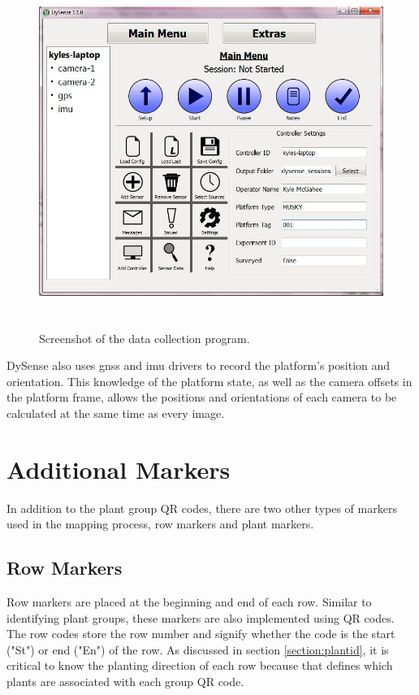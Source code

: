 \begin{figure}
	\centering
    \includegraphics[height=4.5in]{figures/dysense2.jpg}
    \caption[Data collection program]{Screenshot of the data collection program.}
    \label{dysense_screenshot}
\end{figure}

DySense also uses \ac{gnss} and \ac{imu} drivers to record the platform's position and orientation.  This knowledge of the platform state, as well as the camera offsets in the platform frame, allows the positions and orientations of each camera to be calculated at the same time as every image.  

\section{Additional Markers}
\label{system-markers}

In addition to the plant group QR codes, there are two other types of markers used in the mapping process, row markers and plant markers.   

\subsection{Row Markers}

Row markers are placed at the beginning and end of each row. Similar to identifying plant groups, these markers are also implemented using QR codes.  The row codes store the row number and signify whether the code is the start ("St") or end ("En") of the row. As discussed in section \ref{section:plantid}, it is critical to know the planting direction of each row because that defines which plants are associated with each group QR code.

